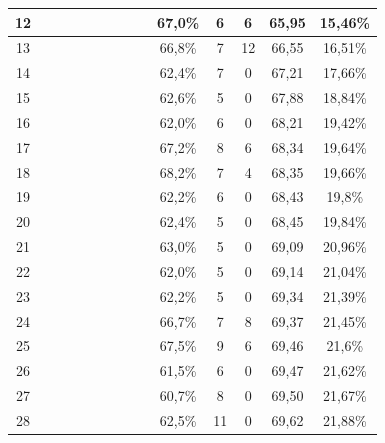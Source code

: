 \begin{longtable}{|c|c|c|c|c|c|c|c|c|c|c|c|c|c|}
12  &  \x    & \x    & \x    & \x    & \x\m  & \x\m  &       &       & 67,0\% &  6  & 6  & 65,95 & 15,46\% \\ \hline
13  &  \x    & \x    & \x    & \x    & \x\m  & \x\m  & \x\m  &       & 66,8\% &  7  & 12 & 66,55 & 16,51\% \\ \hline
14  &  \x    & \x    & \x    &       & \x    &       &       & \x\m  & 62,4\% &  7  & 0  & 67,21 & 17,66\% \\ \hline
15  &  \x    & \x    & \x    & \x    & \x    & \x    &       &       & 62,6\% &  5  & 0  & 67,88 & 18,84\% \\ \hline
16  &  \x    & \x    & \x    &       & \x    & \x    &       & \x    & 62,0\% &  6  & 0  & 68,21 & 19,42\% \\ \hline
17  &  \x    & \x    & \x    &       & \x\m  & \x\m  &       &       & 67,2\% &  8  & 6  & 68,34 & 19,64\% \\ \hline
18  &  \x    & \x    & \x    &       & \x\m  &       &       & \x\m  & 68,2\% &  7  & 4  & 68,35 & 19,66\% \\ \hline
19  &  \x    & \x    & \x    & \x    & \x    & \x    & \x    &       & 62,2\% &  6  & 0  & 68,43 & 19,8\% \\ \hline
20  &  \x    & \x    & \x    & \x    & \x    &       &       & \x\m  & 62,4\% &  5  & 0  & 68,45 & 19,84\% \\ \hline
21  &  \x    & \x    & \x    &       & \x    &       &       &       & 63,0\% &  5  & 0  & 69,09 & 20,96\% \\ \hline
22  &  \x    & \x    & \x    & \x    &       & \x    &       &       & 62,0\% &  5  & 0  & 69,14 & 21,04\% \\ \hline
23  &  \x    & \x    & \x    &       & \x    &       & \x    &       & 62,2\% &  5  & 0  & 69,34 & 21,39\% \\ \hline
24  &  \x    & \x    & \x    & \x    & \x\m  & \x    & \x    &       & 66,7\% &  7  & 8  & 69,37 & 21,45\% \\ \hline
25  &  \x    & \x    & \x    & \x    & \x\m  &       &       & \x\m  & 67,5\% &  9  & 6  & 69,46 & 21,6\% \\ \hline
26  &  \x    & \x    & \x    & \x    & \x    & \x\m  & \x    &       & 61,5\% &  6  & 0  & 69,47 & 21,62\% \\ \hline
27  &  \x    & \x    & \x    & \x    &       & \x\m  &       &       & 60,7\% &  8  & 0  & 69,50 & 21,67\% \\ \hline
28  &  \x    & \x    & \x    & \x    & \x    &       &       &       & 62,5\% &  11 & 0  & 69,62 & 21,88\% \\ \hline

\end{longtable}
